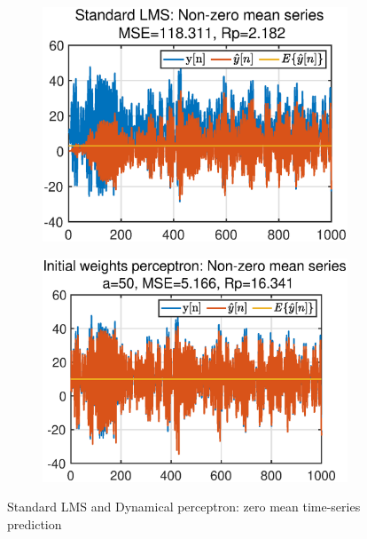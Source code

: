 \begin{figure}[htb]
     \centering
     \hspace{0.4cm}
     \begin{subfigure}[b]{0.4\textwidth}
         \centering
         \includegraphics[width=\textwidth]{fig/4/45a1.eps}
     \end{subfigure}
    \hspace{0.4cm}
     \begin{subfigure}[b]{0.4\textwidth}
         \centering
         \includegraphics[width=\textwidth]{fig/4/45a2.eps}
     \end{subfigure}
     \caption{Standard LMS and Dynamical perceptron: zero mean time-series prediction}
     \label{fig:4_5}
\end{figure}
